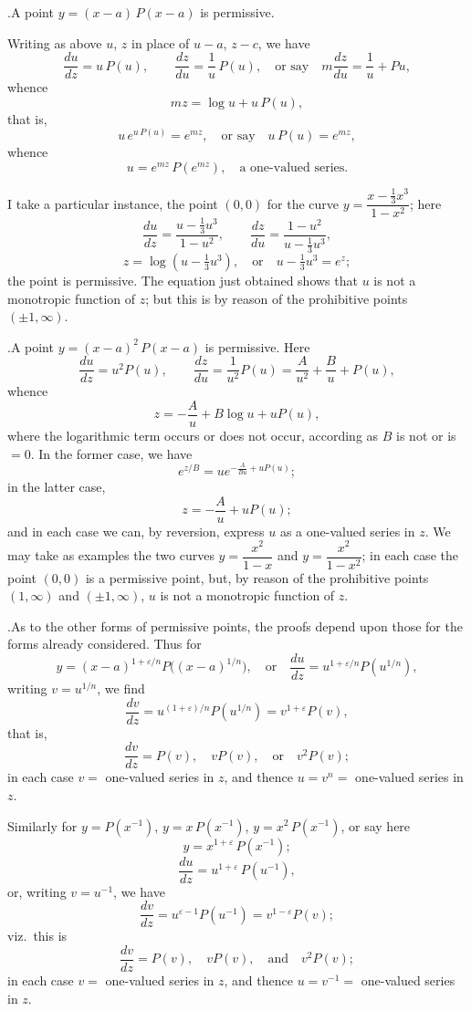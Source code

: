 \documentclass[11pt]{article}
\begin{document}
\medskip

.\quad A point $y = (x-a)\,P(x-a)$ is permissive.

Writing as above $u$, $z$ in place of $u-a$, $z-c$, we have
\[
\frac{du}{dz} = u\,P(u), \qquad \frac{dz}{du} = \frac{1}{u}\,P(u),\quad\text{or say}\quad m\frac{dz}{du} = \frac{1}{u} + P u,
\]
whence
\[
m z = \log u + u\,P(u),
\]
that is,
\[
u\,e^{u\,P(u)} = e^{mz}, \quad \text{or say}\quad u\,P(u) = e^{mz},
\]
whence
\[
u = e^{mz}\,P(e^{mz}), \quad \text{a one-valued series}.
\]

I take a particular instance, the point $(0,0)$ for the curve $y = \dfrac{x-\tfrac{1}{3}x^{3}}{1-x^{2}}$; here
\[
\frac{du}{dz} = \frac{u-\tfrac{1}{3}u^{3}}{1-u^{2}}, \qquad \frac{dz}{du} = \frac{1-u^{2}}{u-\tfrac{1}{3}u^{3}},
\]
\[
z = \log(u-\tfrac{1}{3}u^{3}), \quad\text{or}\quad u-\tfrac{1}{3}u^{3}=e^{z};
\]
the point is permissive. The equation just obtained shows that $u$ is not a monotropic function of $z$; but this is by reason of the prohibitive points $(\pm1,\infty)$.

\medskip

.\quad A point $y = (x-a)^{2}\,P(x-a)$ is permissive. Here
\[
\frac{du}{dz} = u^{2}P(u), \qquad \frac{dz}{du} = \frac{1}{u^{2}}P(u) = \frac{A}{u^{2}}+\frac{B}{u}+P(u),
\]
whence
\[
z = -\frac{A}{u}+B\log u+uP(u),
\]
where the logarithmic term occurs or does not occur, according as $B$ is not or is $=0$. In the former case, we have
\[
e^{z/B}=u e^{-\frac{A}{B u}+uP(u)};
\]
in the latter case,
\[
z = -\frac{A}{u}+uP(u);
\]
and in each case we can, by reversion, express $u$ as a one-valued series in $z$. We may take as examples the two curves $y=\dfrac{x^{2}}{1-x}$ and $y=\dfrac{x^{2}}{1-x^{2}}$; in each case the point $(0,0)$ is a permissive point, but, by reason of the prohibitive points $(1,\infty)$ and $(\pm1,\infty)$, $u$ is not a monotropic function of $z$.

\medskip

.\quad As to the other forms of permissive points, the proofs depend upon those for the forms already considered. Thus for
\[
y=(x-a)^{1+\varepsilon/n}P\bigl((x-a)^{1/n}\bigr),\quad\text{or}\quad \frac{du}{dz}=u^{1+\varepsilon/n}P(u^{1/n}),
\]
writing $v = u^{1/n}$, we find
\[
\frac{dv}{dz}=u^{(1+\varepsilon)/n}P(u^{1/n})=v^{1+\varepsilon}P(v),
\]
that is,
\[
\frac{dv}{dz}=P(v),\quad vP(v),\quad\text{or}\quad v^{2}P(v);
\]
in each case $v=$ one-valued series in $z$, and thence $u=v^{n}=$ one-valued series in $z$.

Similarly for $y = P(x^{-1})$, $y = x\,P(x^{-1})$, $y = x^{2}\,P(x^{-1})$, or say here
\[
y = x^{1+\varepsilon}\,P(x^{-1});
\]
\[
\frac{du}{dz} = u^{1+\varepsilon}\,P(u^{-1}),
\]
or, writing $v = u^{-1}$, we have
\[
\frac{dv}{dz}=u^{\varepsilon-1}P(u^{-1})=v^{1-\varepsilon}P(v);
\]
viz.\ this is
\[
\frac{dv}{dz}=P(v),\quad vP(v),\quad\text{and}\quad v^{2}P(v);
\]
in each case $v=$ one-valued series in $z$, and thence $u = v^{-1} =$ one-valued series in $z$.
\end{document}
